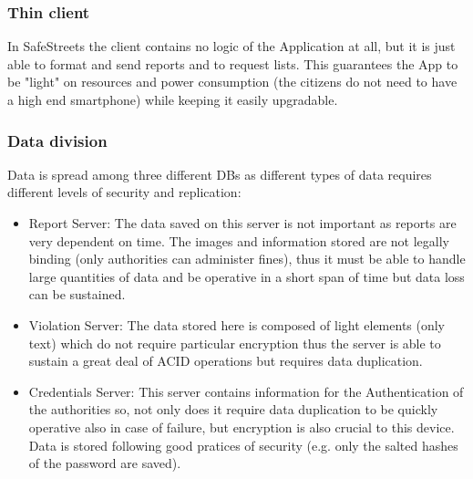 \subsubsection{Thin client}

In SafeStreets the client contains no logic of the Application at all, but it is just able to format and send reports and to request lists.
This guarantees the App to be "light" on resources and power consumption (the citizens do not need to have a high end smartphone) while keeping it easily upgradable.

\subsubsection{Data division}

Data is spread among three different DBs as different types of data requires different levels of security and replication:

\begin{itemize}

    \item  Report Server: The data saved on this server is not important as reports are very dependent on time. The images and information
        stored are not legally binding (only authorities can administer fines), thus it must be able to handle large quantities of data and 
        be operative in a short span of time but data loss can be sustained.

    \item Violation Server: The data stored here is composed of light elements (only text) which do not require particular encryption thus the server 
        is able to sustain a great deal of ACID operations but requires data duplication.

    \item Credentials Server: This server contains information for the Authentication of the authorities so, not only does it require data duplication
        to be quickly operative also in case of failure, but encryption is also crucial to this device. Data is stored following good pratices of 
        security (e.g. only the salted hashes of the password are saved).     

\end{itemize}